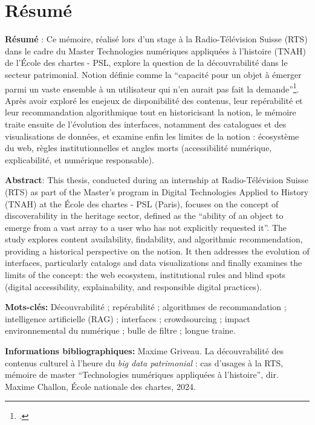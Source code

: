 \documentclass[a4paper,12pt,twoside]{book}
\begin{document}
	\chapter{Résumé}
	\textbf{Résumé} : Ce mémoire, réalisé lors d'un stage à la Radio-Télévision Suisse (RTS) dans le cadre du Master Technologies numériques appliquées à l'histoire (TNAH) de l'École des chartes - PSL, explore la question de la découvrabilité dans le secteur patrimonial. Notion définie comme la \enquote{capacité pour un objet à émerger parmi un vaste ensemble à un utilisateur qui n'en aurait pas fait la demande}\footcite{zotero-263}. Après avoir exploré les enejeux de disponibilité des contenus, leur repérabilité et leur recommandation algorithmique tout en historicisant la notion, le mémoire traite ensuite de l'évolution des interfaces, notamment des catalogues et des visualisations de données, et examine enfin les limites de la notion : écosystème du web, règles institutionnelles et angles morts (accessibilité numérique, explicabilité, et numérique responsable).
	
	\textbf{Abstract}: This thesis, conducted during an internship at Radio-Télévision Suisse (RTS) as part of the Master's program in Digital Technologies Applied to History (TNAH) at the École des chartes - PSL (Paris), focuses on the concept of discoverability in the heritage sector, defined as the \enquote{ability of an object to emerge from a vast array to a user who has not explicitly requested it}. The study explores content availability, findability, and algorithmic recommendation, providing a historical perspective on the notion. It then addresses the evolution of interfaces, particularly catalogs and data visualizations and finally examines the limits of the concept: the web ecosystem, institutional rules and blind spots (digital accessibility, explainability, and responsible digital practices).
	
	\textbf{Mots-clés:} Découvrabilité ; repérabilité ; algorithmes de recommandation ; intelligence artificielle (RAG) ; interfaces ; crowdsourcing ; impact environnemental du numérique ; bulle de filtre ; longue traine.  
	
	\newpage
	
	\textbf{Informations bibliographiques:} Maxime Griveau. La découvrabilité des contenus culturel à l'heure du \textit{big data patrimonial} : cas d'usages à la RTS, mémoire de master \enquote{Technologies numériques appliquées à l'histoire}, dir. Maxime Challon, École nationale des chartes, 2024.
	
\end{document}
